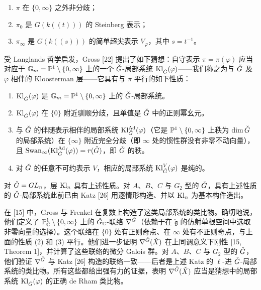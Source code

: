 \begin{enumerate}[label=(\arabic*), leftmargin=1.6em, itemsep=.15em]
\item $\pi$ 在 $\{0,\infty\}$ 之外非分歧；
\item $\pi_0$ 是 $G(k((t)))$ 的 Steinberg 表示；
\item $\pi_\infty$ 是 $G(k((s)))$ 的简单超尖表示 $V_\varphi$，其中 $s=t^{-1}$。
\end{enumerate}

受 Langlands 哲学启发，Gross [22] 提出了如下猜想：自守表示 $\pi=\pi(\varphi)$ 应当对应于 $\mathbb{G}_m=\mathbb{P}^1\setminus\{0,\infty\}$ 上的一个 $\check G$-局部系统 $\mathrm{Kl}_{\check G}(\varphi)$——我们称之为与 $\check G$ 及 $\varphi$ 相伴的 Kloosterman 层——它具有与 $\pi$ 平行的如下性质：

\begin{enumerate}[label=(\arabic*), leftmargin=1.6em, itemsep=.15em]
\item $\mathrm{Kl}_{\check G}(\varphi)$ 是 $\mathbb{G}_m=\mathbb{P}^1\setminus\{0,\infty\}$ 上的 $\check G$-局部系统。
\item $\mathrm{Kl}_{\check G}(\varphi)$ 在 $\{0\}$ 附近驯顺分歧，且单值是 $\check G$ 中的正则幂幺元。
\item 与 $\check G$ 的伴随表示相伴的局部系统 $\mathrm{Kl}^{\mathrm{Ad}}_{\check G}(\varphi)$（它是 $\mathbb{P}^1\setminus\{0,\infty\}$ 上秩为 $\dim\check G$ 的局部系统）在 $\{\infty\}$ 附近完全分歧（即 $\infty$ 处的惯性群没有非零不动向量），且 $\mathrm{Swan}_\infty(\mathrm{Kl}^{\mathrm{Ad}}_{\check G}(\varphi))=r(\check G)$，即 $\check G$ 的秩。
\item 对 $\check G$ 的任意不可约表示 $V$，相应的局部系统 $\mathrm{Kl}^V_{\check G}(\varphi)$ 是纯的。
\end{enumerate}

对 $\check G=GL_n$，层 $\mathrm{Kl}_n$ 具有上述性质。对 $A$、$B$、$C$ 与 $G_2$ 型的 $\check G$，具有上述性质的 $\check G$-局部系统此前已由 Katz [26] 用逐情形构造、并以 $\mathrm{Kl}_n$ 为基本构件造出。

在 [15] 中，Gross 与 Frenkel 在复数上构造了这类局部系统的类比物。确切地说，他们定义了 $\mathbb{P}^1_{\mathbb{C}}\setminus\{0,\infty\}$ 上的 $\check G_{\mathbb{C}}$-联络 $\nabla^{\check G}$（依赖于在 $\check{\mathfrak g}$ 的仿射单根空间中选取非零向量的选择）。这个联络在 $\{0\}$ 处有正则奇点、在 $\infty$ 处有不正则奇点，与上面的性质 (2) 和 (3) 平行。他们进一步证明 $\nabla^{\check G}(\check X)$ 在上同调意义下刚性 [15, Theorem 1]，并计算了这些联络的微分 Galois 群。对 $A$、$B$、$C$ 与 $G_2$ 型的 $\check G$，他们验证 $\nabla^{\check G}$ 与 Katz [26] 构造的联络一致——后者是上述 Katz 的 $\ell$-进 $\check G$-局部系统的类比物。所有这些都给出强有力的证据，表明 $\nabla^{\check G}(\check X)$ 应当是猜想中的局部系统 $\mathrm{Kl}_{\check G}(\varphi)$ 的正确 de Rham 类比物。


